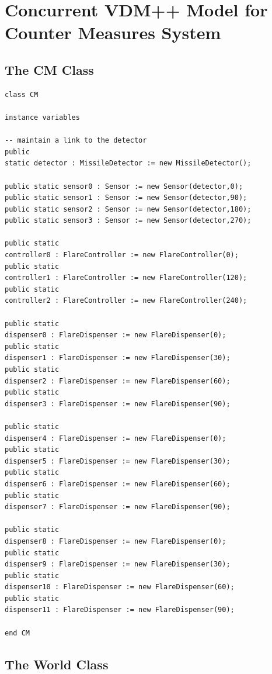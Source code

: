 \documentclass{overturerepchap}
\begin{document}
\section{Concurrent VDM++ Model for Counter Measures System}\label{app:concurCM}
\subsection{The CM Class}

\begin{lstlisting}
class CM

instance variables

-- maintain a link to the detector
public 
static detector : MissileDetector := new MissileDetector();

public static sensor0 : Sensor := new Sensor(detector,0);
public static sensor1 : Sensor := new Sensor(detector,90);
public static sensor2 : Sensor := new Sensor(detector,180);
public static sensor3 : Sensor := new Sensor(detector,270);

public static 
controller0 : FlareController := new FlareController(0);
public static 
controller1 : FlareController := new FlareController(120);
public static 
controller2 : FlareController := new FlareController(240);

public static 
dispenser0 : FlareDispenser := new FlareDispenser(0);
public static 
dispenser1 : FlareDispenser := new FlareDispenser(30);
public static 
dispenser2 : FlareDispenser := new FlareDispenser(60);
public static 
dispenser3 : FlareDispenser := new FlareDispenser(90);

public static 
dispenser4 : FlareDispenser := new FlareDispenser(0);
public static 
dispenser5 : FlareDispenser := new FlareDispenser(30);
public static 
dispenser6 : FlareDispenser := new FlareDispenser(60);
public static 
dispenser7 : FlareDispenser := new FlareDispenser(90);

public static 
dispenser8 : FlareDispenser := new FlareDispenser(0);
public static 
dispenser9 : FlareDispenser := new FlareDispenser(30);
public static 
dispenser10 : FlareDispenser := new FlareDispenser(60);
public static 
dispenser11 : FlareDispenser := new FlareDispenser(90);

end CM
\end{lstlisting}

\subsection{The World Class}
\end{document}
